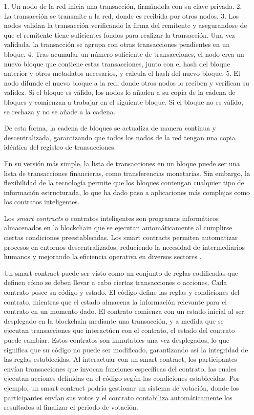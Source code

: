 1. Un nodo de la red inicia una transacción, firmándola con su clave privada.
2. La transacción se transmite a la red, donde es recibida por otros nodos.
3. Los nodos validan la transacción verificando la firma del remitente y asegurandose de que el remitente tiene suficientes fondos para realizar la transacción. Una vez validada, la transacción se agrupa con otras transacciones pendientes en un bloque.
4. Tras acumular un número suficiente de transacciones, el nodo crea un nuevo bloque que contiene estas transacciones, junto con el hash del bloque anterior y otros metadatos necesarios, y calcula el hash del nuevo bloque.
5. El nodo difunde el nuevo bloque a la red, donde otros nodos lo reciben y verifican su validez. Si el bloque es válido, los nodos lo añaden a su copia de la cadena de bloques y comienzan a trabajar en el siguiente bloque. Si el bloque no es válido, se rechaza y no se añade a la cadena.

De esta forma, la cadena de bloques se actualiza de manera continua y descentralizada, garantizando que todos los nodos de la red tengan una copia idéntica del registro de transacciones. 

En su versión más simple, la lista de transacciones en un bloque puede ser una lista de transacciones financieras, como transferencias monetarias. Sin embargo, la flexibilidad de la tecnología permite que los bloques contengan cualquier tipo de información estructurada, lo que ha dado paso a aplicaciones más complejas como los contratos inteligentes.

Los \textit{smart contracts} o contratos inteligentes son programas informáticos almacenados en la blockchain que se ejecutan automáticamente al cumplirse ciertas condiciones preestablecidas. Los smart contracts permiten automatizar procesos en entornos descentralizados, reduciendo la necesidad de intermediarios humanos y mejorando la eficiencia operativa en diversos sectores \cite{farhana2022blockchain}.

Un smart contract puede ser visto como un conjunto de reglas codificadas que definen cómo se deben llevar a cabo ciertas transacciones o acciones. Cada contrato posee su código y estado. El código define las reglas y condiciones del contrato, mientras que el estado almacena la información relevante para el contrato en un momento dado. El contrato comienza con un estado inicial al ser desplegado en la blockchain mediante una transacción, y a medida que se ejecutan transacciones que interactúen con el contrato, el estado del contrato puede cambiar. Estos contratos son inmutables una vez desplegados, lo que significa que su código no puede ser modificado, garantizando así la integridad de las reglas establecidas. Al interactuar con un smart contract, los participantes envían transacciones que invocan funciones específicas del contrato, las cuales ejecutan acciones definidas en el código según las condiciones establecidas. Por ejemplo, un smart contract podría gestionar un sistema de votación, donde los participantes envían sus votos y el contrato contabiliza automáticamente los resultados al finalizar el periodo de votación. 

